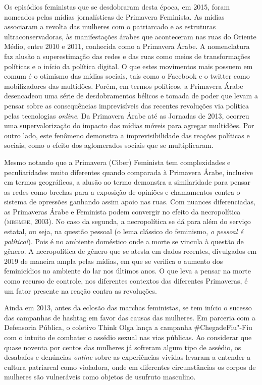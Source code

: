 Os episódios feministas que se desdobraram desta época, em 2015, foram
nomeados pelas mídias jornalísticas de Primavera Feminista. As
mídias associaram a revolta das mulheres com o patriarcado e as
estruturas ultraconservadoras, às manifestações árabes que aconteceram
nas ruas do Oriente Médio, entre 2010 e 2011, conhecida como a Primavera
Árabe. A nomenclatura faz alusão a superestimação das redes e das ruas
como meios de transformações políticas e o início da política digital. O
que estes movimentos mais possuem em comum é o otimismo das mídias
sociais, tais como o Facebook e o twitter como mobilizadores das
multidões. Porém, em termos políticos, a Primavera Árabe desencadeou uma
série de desdobramentos bélicos e tomada de poder que levam a pensar
sobre as consequências imprevisíveis das recentes revoluções via
política pelas tecnologias \textit{online}. Da Primavera Árabe até as Jornadas
de 2013, ocorreu uma supervalorização do impacto das mídias móveis para
agregar multidões. Por outro lado, este fenômeno demonstra a
imprevisibilidade das reações políticas e sociais, como o efeito dos
aglomerados sociais que se multiplicaram.

Mesmo notando que a Primavera (Ciber) Feminista tem complexidades e
peculiaridades muito diferentes quando comparada à Primavera Árabe,
inclusive em termos geográficos, a alusão ao termo demonstra a
similaridade para pensar as redes como brechas para a exposição de
opiniões e chamamentos contra o sistema de opressões ganhando assim
apoio nas ruas. Com nuances diferenciadas, as Primaveras Árabe e
Feminista podem convergir no efeito da necropolítica (\textsc{mbembe}, 2003). No
caso da segunda, a necropolítica se dá para além do serviço estatal, ou
seja, na questão pessoal (o lema clássico do feminismo, \textit{o pessoal é
político!}). Pois é no ambiente doméstico onde a morte se vincula à
questão de gênero. A necropolítica de gênero que se atesta em dados
recentes, divulgados em 2019 de maneira ampla pelas mídias, em que se
verifica o aumento dos feminicídios no ambiente do lar nos últimos anos.
O que leva a pensar na morte como recurso de controle, nos diferentes
contextos das diferentes Primaveras, é um fator presente na reação
contra as revoluções.

Ainda em 2013, antes da eclosão das marchas feministas, se tem início o
sucesso das campanhas de hashtag em favor das causas das mulheres. Em
parceria com a Defensoria Pública, o coletivo Think Olga lança a
campanha \#ChegadeFiu"-Fiu com o intuito de combater o assédio sexual nas
vias públicas. Ao considerar que quase noventa por centos das mulheres
já sofreram algum tipo de assédio, os desabafos e denúncias \textit{online}
sobre as experiências vividas levaram a entender a cultura patriarcal
como violadora, onde em diferentes circunstâncias os corpos de mulheres
são vulneráveis como objetos de usufruto masculino.

